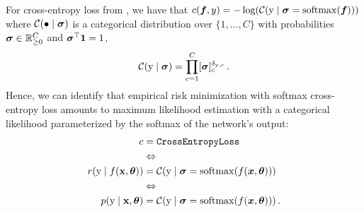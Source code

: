 \begin{example}\label{ex:cross_entropy_loss_probabilistic}
  For cross-entropy loss from , we have that $c({\bm{f}}, y) = - \log( {\mathcal{C}}({\textnormal{y}} \mid {\bm{\sigma}} = \mathrm{softmax}({\bm{f}}) ))$ where ${\mathcal{C}}(\bullet \mid {\bm{\sigma}})$ is a categorical distribution over $\{1, \dots, C\}$ with probabilities ${\bm{\sigma}} \in {\mathbb{R}}^C_{\ge 0}$ and ${\bm{\sigma}}^\top {\bm{1}} = 1$,
  \begin{align*}
    {\mathcal{C}}({\textnormal{y}} \mid {\bm{\sigma}})
    =
    \prod_{c=1}^C [{\bm{\sigma}}]_c^{\delta_{{\textnormal{y}},c}}\,.
  \end{align*}
  Hence, we can identify that empirical risk minimization with softmax cross-entropy loss amounts to maximum likelihood estimation with a categorical likelihood parameterized by the softmax of the network's output:
  \begin{align*}
    c                             & = \text{\texttt{CrossEntropyLoss}}
    \\
                                  & \Leftrightarrow
    \\
    r({\textnormal{y}} \mid f({\mathbf{x}}, {\bm{\theta}})) & = {\mathcal{C}}({\textnormal{y}} \mid {\bm{\sigma}} = \mathrm{softmax}(f({\bm{x}}, {\bm{\theta}})))\,
    \\
                                  & \Leftrightarrow
    \\
    p({\textnormal{y}} \mid {\mathbf{x}}, {\bm{\theta}})    & = {\mathcal{C}}({\textnormal{y}} \mid {\bm{\sigma}} = \mathrm{softmax}(f({\bm{x}}, {\bm{\theta}})))\,.
  \end{align*}
\end{example}
\switchcolumn[0]
